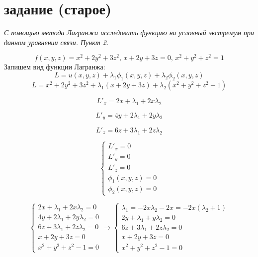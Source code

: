 \documentclass[a5paper, 10pt]{article}
\theoremstyle{definition}
\theoremstyle{plain}
\theoremstyle{remark}
\begin{document}
\newpage

\section{задание (старое)}
\textit{С помощью метода Лагранжа исследовать функцию на условный экстремум при данном уравнении связи. Пункт 2.}

\begin{equation}
f(x, y, z) = x^2+2y^2+3z^2, \, x + 2y+3z=0, \, x^2 +y^2+z^2=1
\end{equation}
Запишем вид функции Лагранжа:
\begin{equation}
L = u(x, y, z) + \lambda_1 \phi_1 (x, y, z) + \lambda_2 \phi_2 (x, y, z)
\end{equation}
\begin{equation}
L =  x^2+2y^2+3z^2 + \lambda_1 ( x + 2y+3z) + \lambda_2 (x^2 +y^2+z^2 - 1)
\end{equation}

\begin{equation}
L'_x =  2x+ \lambda_1  + 2x \lambda_2
\end{equation}

\begin{equation}
L'_y = 4y + 2\lambda_1  + 2y \lambda_2 
\end{equation}

\begin{equation}
L'_z =  6z +3 \lambda_1 + 2z \lambda_2 
\end{equation}

\begin{equation}
\begin{cases}
L'_x = 0\\
L'_y = 0\\
L'_z = 0\\
\phi_1 (x, y, z) = 0\\
\phi_2 (x, y, z) = 0
\end{cases}
\end{equation}

\begin{equation}
\begin{cases}
 2x+ \lambda_1  + 2x \lambda_2 = 0\\
4y + 2\lambda_1  + 2y \lambda_2  = 0\\
6z +3 \lambda_1 + 2z \lambda_2  = 0\\
 x + 2y+3z = 0\\
x^2 +y^2+z^2 - 1 = 0
\end{cases}
\to
\begin{cases}
 \lambda_1  = -2x \lambda_2 -2x = -2x(\lambda_2 + 1)\\
2y + \lambda_1  + y \lambda_2  = 0\\
6z +3 \lambda_1 + 2z \lambda_2  = 0\\
 x + 2y+3z = 0\\
x^2 +y^2+z^2 - 1 = 0
\end{cases}
\end{equation}
\end{document}
